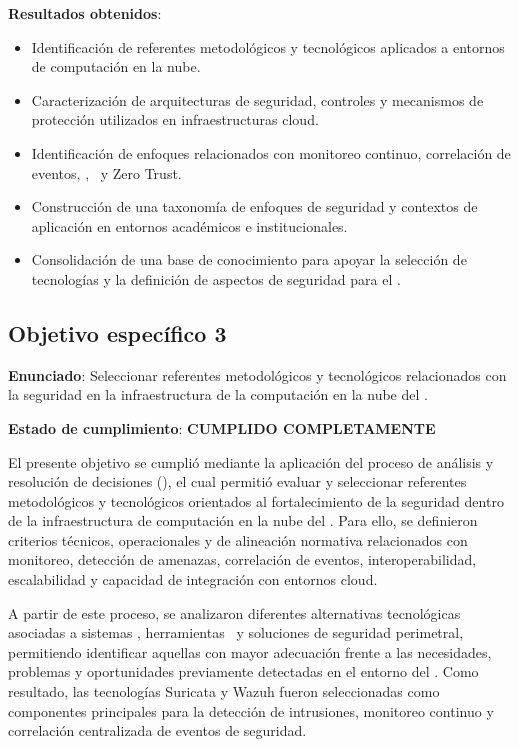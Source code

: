 \textbf{Resultados obtenidos}:
\begin{itemize}
    \item Identificación de referentes metodológicos y tecnológicos aplicados a entornos de computación en la nube.
	\item Caracterización de arquitecturas de seguridad, controles y mecanismos de protección utilizados en infraestructuras cloud.
	\item Identificación de enfoques relacionados con monitoreo continuo, correlación de eventos, \SIEM, \IDPS\ y Zero Trust.
	\item Construcción de una taxonomía de enfoques de seguridad y contextos de aplicación en entornos académicos e institucionales.
	\item Consolidación de una base de conocimiento para apoyar la selección de tecnologías y la definición de aspectos de seguridad para el \GRID.
\end{itemize}

\subsection{Objetivo específico 3}
\noindent

\textbf{Enunciado}: Seleccionar referentes metodológicos y tecnológicos relacionados con la seguridad en la infraestructura de la 
computación en la nube del \GRID.

\textbf{Estado de cumplimiento}: \textbf{CUMPLIDO COMPLETAMENTE}

El presente objetivo se cumplió mediante la aplicación del proceso de análisis y resolución de decisiones (\DAR), el cual permitió evaluar 
y seleccionar referentes metodológicos y tecnológicos orientados al fortalecimiento de la seguridad dentro de la infraestructura de 
computación en la nube del \GRID. Para ello, se definieron criterios técnicos, operacionales y de alineación normativa relacionados con 
monitoreo, detección de amenazas, correlación de eventos, interoperabilidad, escalabilidad y capacidad de integración con entornos cloud.

A partir de este proceso, se analizaron diferentes alternativas tecnológicas asociadas a sistemas \SIEM, herramientas \IDPS\ y soluciones de 
seguridad perimetral, permitiendo identificar aquellas con mayor adecuación frente a las necesidades, problemas y oportunidades previamente 
detectadas en el entorno del \GRID. Como resultado, las tecnologías Suricata y Wazuh fueron seleccionadas como componentes principales para 
la detección de intrusiones, monitoreo continuo y correlación centralizada de eventos de seguridad.

